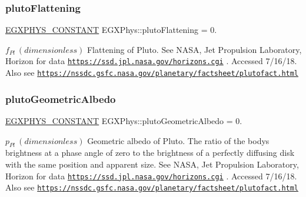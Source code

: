 \subsubsection{\texorpdfstring{pluto\+Flattening}{plutoFlattening}}
{\footnotesize\ttfamily \mbox{\hyperlink{group___e_g_x_phys-_constants-_macros_ga76980d288494ce1714c9ac68a95ba702}{E\+G\+X\+P\+H\+Y\+S\+\_\+\+C\+O\+N\+S\+T\+A\+NT}} E\+G\+X\+Phys\+::pluto\+Flattening = 0.}

$f_{Pl} \ (dimensionless)$ Flattening of Pluto. See N\+A\+SA, Jet Propulsion Laboratory, Horizon for data \href{https://ssd.jpl.nasa.gov/horizons.cgi}{\tt https\+://ssd.\+jpl.\+nasa.\+gov/horizons.\+cgi} . Accessed 7/16/18. Also see \href{https://nssdc.gsfc.nasa.gov/planetary/factsheet/plutofact.html}{\tt https\+://nssdc.\+gsfc.\+nasa.\+gov/planetary/factsheet/plutofact.\+html} \mbox{\label{group___e_g_x_phys-_constants-_astrophysics-_solar_system-_pluto-_bulk_ga8d3aa3bc7e6cd541e2b12538d3e55918}} 
\subsubsection{\texorpdfstring{pluto\+Geometric\+Albedo}{plutoGeometricAlbedo}}
{\footnotesize\ttfamily \mbox{\hyperlink{group___e_g_x_phys-_constants-_macros_ga76980d288494ce1714c9ac68a95ba702}{E\+G\+X\+P\+H\+Y\+S\+\_\+\+C\+O\+N\+S\+T\+A\+NT}} E\+G\+X\+Phys\+::pluto\+Geometric\+Albedo = 0.}

$ p_{Pl} \ (dimensionless)$ Geometric albedo of Pluto. The ratio of the body\textquotesingle{}s brightness at a phase angle of zero to the brightness of a perfectly diffusing disk with the same position and apparent size. See N\+A\+SA, Jet Propulsion Laboratory, Horizon for data \href{https://ssd.jpl.nasa.gov/horizons.cgi}{\tt https\+://ssd.\+jpl.\+nasa.\+gov/horizons.\+cgi} . Accessed 7/16/18. Also see \href{https://nssdc.gsfc.nasa.gov/planetary/factsheet/plutofact.html}{\tt https\+://nssdc.\+gsfc.\+nasa.\+gov/planetary/factsheet/plutofact.\+html} \mbox{\label{group___e_g_x_phys-_constants-_astrophysics-_solar_system-_pluto-_bulk_ga64b5fe1eec8bbe847b7d69ec64f471af}} 
